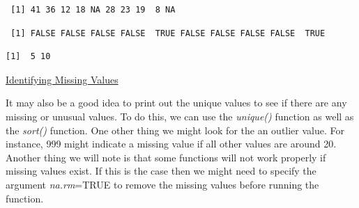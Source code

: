 \documentclass[
  letterpaper,
  DIV=11,
  numbers=noendperiod]{scrreprt}
\newenvironment{Shaded}{\begin{snugshade}}{\end{snugshade}}
\newcommand{\DecValTok}[1]{\textcolor[rgb]{0.68,0.00,0.00}{#1}}
\newcommand{\FunctionTok}[1]{\textcolor[rgb]{0.28,0.35,0.67}{#1}}
\newcommand{\NormalTok}[1]{\textcolor[rgb]{0.00,0.23,0.31}{#1}}
\newcommand{\SpecialCharTok}[1]{\textcolor[rgb]{0.37,0.37,0.37}{#1}}
\begin{document}
\begin{Shaded}
\end{Shaded}

\begin{verbatim}
 [1] 41 36 12 18 NA 28 23 19  8 NA
\end{verbatim}

\begin{Shaded}
\end{Shaded}

\begin{verbatim}
 [1] FALSE FALSE FALSE FALSE  TRUE FALSE FALSE FALSE FALSE  TRUE
\end{verbatim}

\begin{Shaded}
\end{Shaded}

\begin{verbatim}
[1]  5 10
\end{verbatim}

\begin{watch}{}{}
    \href{https://youtu.be/Gj_-ZS9wH6c}{Identifying Missing Values}
\end{watch}

It may also be a good idea to print out the unique values to see if
there are any missing or unusual values. To do this, we can use the
\emph{unique()} function as well as the \emph{sort()} function. One
other thing we might look for the an outlier value. For instance, 999
might indicate a missing value if all other values are around 20.
Another thing we will note is that some functions will not work properly
if missing values exist. If this is the case then we might need to
specify the argument \emph{na.rm}=TRUE to remove the missing values
before running the function.
\end{document}
